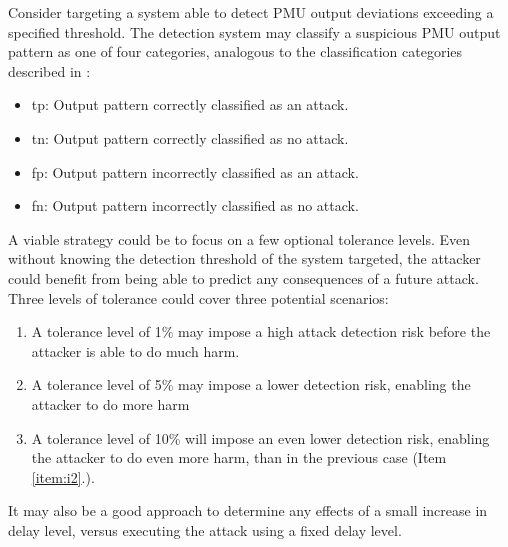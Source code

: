 Consider targeting a system able to detect PMU output deviations exceeding a specified threshold. The detection system may classify a suspicious PMU output pattern as one of four categories, analogous to the classification categories described in \cite[p. 5]{kunang2021attack}: 
\begin{itemize}
    \item \acrfull{tp}: Output pattern correctly classified as an attack.
    \item \acrfull{tn}:  Output pattern correctly classified as no attack.
    \item \acrfull{fp}: Output pattern incorrectly classified as an attack.
    \item \acrfull{fn}: Output pattern incorrectly classified as no attack.

\end{itemize}

 
A viable strategy could be to focus on a few optional tolerance levels. Even without knowing the detection threshold of the system targeted, the attacker could benefit from being able to predict any consequences of a future attack. Three levels of tolerance could cover three potential scenarios:
\begin{enumerate}
    \item A tolerance level of 1\% may impose a high attack detection risk before the attacker is able to do much harm.
    \item A tolerance level of 5\% may impose a lower detection risk, enabling the attacker to do more harm
\label{item:i2}    \item A tolerance level of 10\% will impose an even lower detection risk, enabling the attacker to do even more harm, than in the previous case (Item \ref{item:i2}.).
    
\end{enumerate}

It may also be a good approach to determine any effects of a small increase in delay level, versus executing the attack using a fixed delay level.

